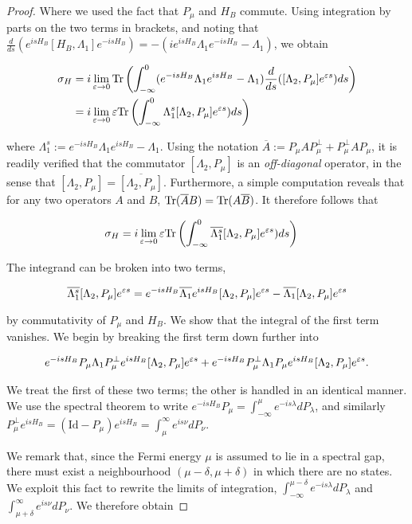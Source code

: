 \documentclass[12pt, letterpaper]{article}
\begin{document}
\begin{proof}
Where we used the fact that $P_\mu$ and $H_B$ commute. Using integration by parts on the two terms in brackets, and noting that $\frac{d}{ds}(e^{isH_B}[H_B,\Lambda_1] e^{-isH_B}) = -(ie^{isH_B}\Lambda_1 e^{-isH_B} - \Lambda_1)$, we obtain

\[\begin{aligned}
\sigma_H &= i \lim_{\varepsilon\to 0}\text{Tr} \left( \int_{-\infty}^0 (e^{-isH_B}\Lambda_1e^{isH_B} - \Lambda_1)\frac{d}{ds}([\Lambda_2, P_\mu] e^{\varepsilon s})ds\right)\\
&= i \lim_{\varepsilon\to 0}\varepsilon \text{Tr} \left( \int_{-\infty}^0 \Lambda_1^s[\Lambda_2, P_\mu] e^{\varepsilon s})ds\right)\\
\end{aligned}\]

where $\Lambda_1^s := e^{-isH_B}\Lambda_1e^{isH_B} - \Lambda_1$. Using the notation $\overline{A} := P_\mu AP_\mu^\perp + P_\mu^\perp A P_\mu$, it is readily verified that the commutator $[\Lambda_2, P_\mu]$ is an \textit{off-diagonal} operator, in the sense that  $[\Lambda_2, P_\mu] = \overline{[\Lambda_2,P_\mu]}$. Furthermore, a simple computation reveals that for any two operators $A$ and $B$, $\text{Tr}(\overline{A}B) = \text{Tr}(A\overline{B})$. It therefore follows that

\[\begin{aligned}
\sigma_H &= i \lim_{\varepsilon\to 0}\varepsilon \text{Tr} \left( \int_{-\infty}^0 \overline{\Lambda_1^s}[\Lambda_2, P_\mu] e^{\varepsilon s})ds\right)
\end{aligned}\]

The integrand can be broken into two terms, 

\[\overline{\Lambda_1^s}[\Lambda_2, P_\mu] e^{\varepsilon s} = e^{-isH_B}\overline{\Lambda_1}e^{isH_B}[\Lambda_2, P_\mu]e^{\varepsilon s} - \overline{\Lambda_1}[\Lambda_2, P_\mu]e^{\varepsilon s}\]

by commutativity of $P_\mu$ and $H_B$. We show that the integral of the first term vanishes. We begin by breaking the first term down further into

\[e^{-isH_B}P_\mu \Lambda_1 P_\mu^\perp e^{isH_B}[\Lambda_2, P_\mu]e^{\varepsilon s} + e^{-isH_B}P_\mu^\perp \Lambda_1 P_\mu e^{isH_B}[\Lambda_2, P_\mu]e^{\varepsilon s}.\]

We treat the first of these two terms; the other is handled in an identical manner. We use the spectral theorem to write $e^{-isH_B}P_\mu = \int_{-\infty}^\mu e^{-is\lambda}dP_\lambda$, and similarly $P_\mu^\perp e^{isH_B} = (\text{Id} - P_\mu) e^{isH_B} = \int_\mu^\infty e^{is\nu} dP_\nu$. 

We remark that, since the Fermi energy $\mu$ is assumed to lie in a spectral gap, there must exist a neighbourhood $(\mu-\delta, \mu+\delta)$ in which there are no states. We exploit this fact to rewrite the limits of integration, $\int_{-\infty}^{\mu-\delta} e^{-is\lambda}dP_\lambda$ and $\int_{\mu+\delta}^\infty e^{is\nu} dP_\nu$. We therefore obtain


\end{proof}
\end{document}
